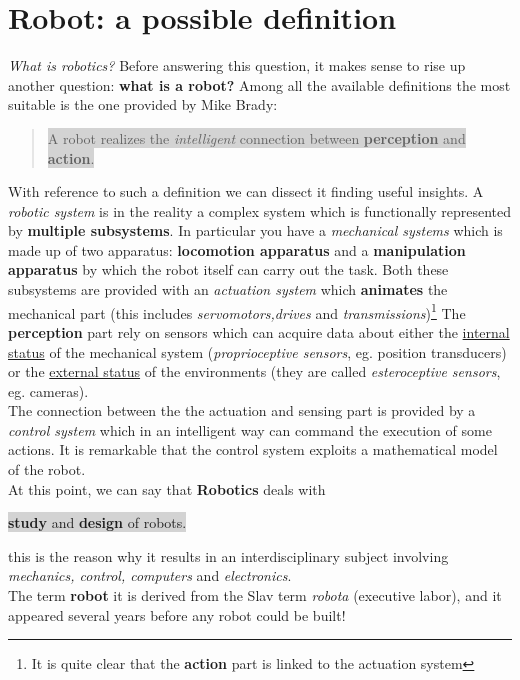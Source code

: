 \section{Robot: a possible definition}
\textit{What is robotics?} Before answering this question, it makes sense to rise up another question: \textbf{what is a robot?} Among all the available definitions the most suitable is the one provided by \textsf{Mike Brady}:
\begin{quotation}
    \colorbox{lightgray}{A robot realizes the \textit{intelligent} connection between \textbf{perception} and \textbf{action}.}
\end{quotation}
With reference to such a definition we can dissect it finding useful insights. A \textit{robotic system} is in the reality a complex system which is functionally represented by \textbf{multiple subsystems}. In particular you have a \textit{mechanical systems} which is made up of two apparatus: \textbf{locomotion apparatus} and a \textbf{manipulation apparatus} by which the robot itself can carry out the task. Both these subsystems are provided with an \textit{actuation system} which \textbf{animates} the mechanical part (this includes \textit{servomotors,drives} and \textit{transmissions})\footnote{
    It is quite clear that the \textbf{action} part is linked to the actuation system
}
The \textbf{perception} part rely on sensors which can acquire data about either the \underline{internal status} of the mechanical system (\textit{proprioceptive sensors}, eg. position transducers) or the \underline{external status} of the environments (they are called \textit{esteroceptive sensors}, eg. cameras).\\
The connection between the the actuation and sensing part is provided by a \textit{control system} which in an intelligent way can command the execution of some actions. It is remarkable that the control system exploits a mathematical model of the robot.\\
At this point, we can say that \textbf{Robotics} deals with
\begin{center}
    \normalsize
    \colorbox{lightgray}{\textbf{study} and \textbf{design} of robots.}
\end{center}
this is the reason why it results in an interdisciplinary subject involving \textit{mechanics, control, computers} and \textit{electronics}.\\
The term \textbf{robot} it is derived from the Slav term \textit{robota} (executive labor), and it appeared several years before any robot could be built!

